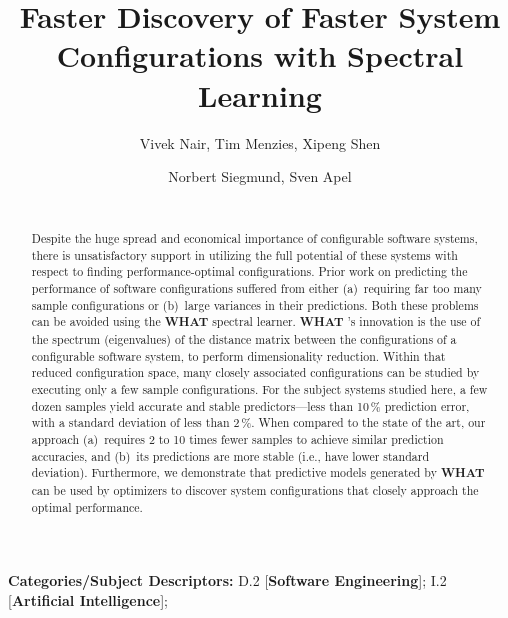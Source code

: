 \documentclass{newsig}
\newcommand{\what}{{\bf WHAT }}
\begin{document}
\title{Faster Discovery of Faster System Configurations with Spectral Learning} 
\author{
        \alignauthor Vivek Nair, Tim Menzies, Xipeng Shen 
        \\
    \and  
        \alignauthor Norbert Siegmund, Sven Apel \\
        \\
       }
\maketitle 
\thispagestyle{plain}
\pagestyle{plain}
\begin{abstract}
Despite the huge spread and economical importance of configurable software systems, there is  unsatisfactory support in utilizing the full potential of these systems with respect to finding performance-optimal configurations.
Prior work on predicting the performance of software configurations suffered from either (a)~requiring far too many sample configurations or (b)~large variances in their predictions.
Both these problems can be avoided using the \what spectral learner.  
{\what}'s innovation is  
the use of the spectrum (eigenvalues) of the distance matrix
between the configurations of a configurable software system, to perform dimensionality reduction. Within that
reduced configuration space, many closely associated configurations can be studied
by executing only a few sample configurations. For the subject systems studied
here, a few dozen samples yield accurate and stable predictors---less than 10\,\% prediction error, with a standard deviation of less than 2\,\%.  
When compared to the state of the art, our approach (a)~requires 
2 to 10 times fewer samples to achieve similar prediction accuracies,
and (b)~its predictions are  more stable (i.e., have lower standard
deviation). 
Furthermore, we demonstrate that predictive models generated by
\what can be used by optimizers to discover system configurations that closely approach the optimal performance.
\end{abstract}

\vspace{1ex}
\noindent
{\bf Categories/Subject Descriptors:} 
D.2 [{\bf Software Engineering}];
I.2 [{\bf Artificial Intelligence}];
\end{document}
